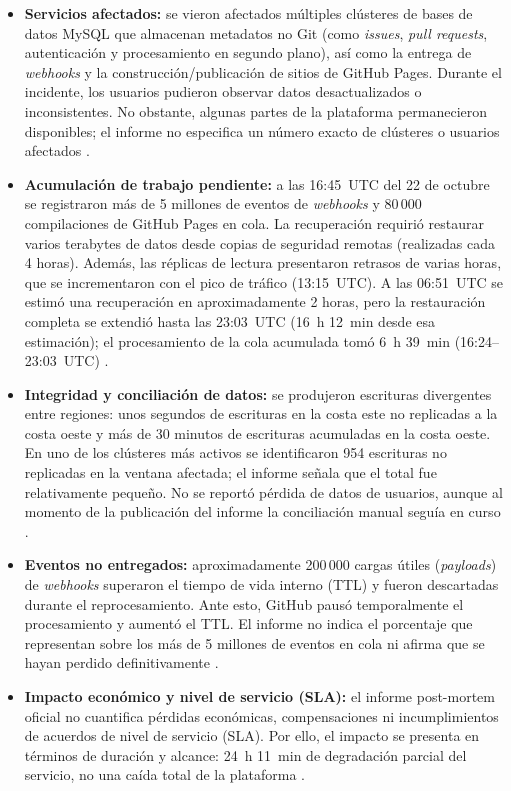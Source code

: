 \documentclass[11pt,a4paper]{article}
\begin{document}
\begin{itemize}
    \item \textbf{Servicios afectados:} se vieron afectados m\'ultiples cl\'usteres de bases de datos MySQL que almacenan metadatos no Git (como \textit{issues}, \textit{pull requests}, autenticaci\'on y procesamiento en segundo plano), as\'i como la entrega de \textit{webhooks} y la construcci\'on/publicaci\'on de sitios de GitHub Pages. Durante el incidente, los usuarios pudieron observar datos desactualizados o inconsistentes. No obstante, algunas partes de la plataforma permanecieron disponibles; el informe no especifica un n\'umero exacto de cl\'usteres o usuarios afectados \cite{github2018}.

    \item \textbf{Acumulaci\'on de trabajo pendiente:} a las 16:45~UTC del 22 de octubre se registraron m\'as de 5 millones de eventos de \textit{webhooks} y 80\,000 compilaciones de GitHub Pages en cola. La recuperaci\'on requiri\'o restaurar varios terabytes de datos desde copias de seguridad remotas (realizadas cada 4 horas). Adem\'as, las r\'eplicas de lectura presentaron retrasos de varias horas, que se incrementaron con el pico de tr\'afico (13:15~UTC). A las 06:51~UTC se estim\'o una recuperaci\'on en aproximadamente 2 horas, pero la restauraci\'on completa se extendi\'o hasta las 23:03~UTC (16~h 12~min desde esa estimaci\'on); el procesamiento de la cola acumulada tom\'o 6~h 39~min (16:24--23:03~UTC) \cite{github2018}.

    \item \textbf{Integridad y conciliaci\'on de datos:} se produjeron escrituras divergentes entre regiones: unos segundos de escrituras en la costa este no replicadas a la costa oeste y m\'as de 30 minutos de escrituras acumuladas en la costa oeste. En uno de los cl\'usteres m\'as activos se identificaron 954 escrituras no replicadas en la ventana afectada; el informe se\~nala que el total fue relativamente peque\~no. No se report\'o p\'erdida de datos de usuarios, aunque al momento de la publicaci\'on del informe la conciliaci\'on manual segu\'ia en curso \cite{github2018}.

    \item \textbf{Eventos no entregados:} aproximadamente 200\,000 cargas \'utiles (\textit{payloads}) de \textit{webhooks} superaron el tiempo de vida interno (TTL) y fueron descartadas durante el reprocesamiento. Ante esto, GitHub paus\'o temporalmente el procesamiento y aument\'o el TTL. El informe no indica el porcentaje que representan sobre los m\'as de 5 millones de eventos en cola ni afirma que se hayan perdido definitivamente \cite{github2018}.

    \item \textbf{Impacto econ\'omico y nivel de servicio (SLA):} el informe post-mortem oficial no cuantifica p\'erdidas econ\'omicas, compensaciones ni incumplimientos de acuerdos de nivel de servicio (SLA). Por ello, el impacto se presenta en t\'erminos de duraci\'on y alcance: 24~h 11~min de degradaci\'on parcial del servicio, no una ca\'ida total de la plataforma \cite{github2018}.
\end{itemize}
\end{document}
